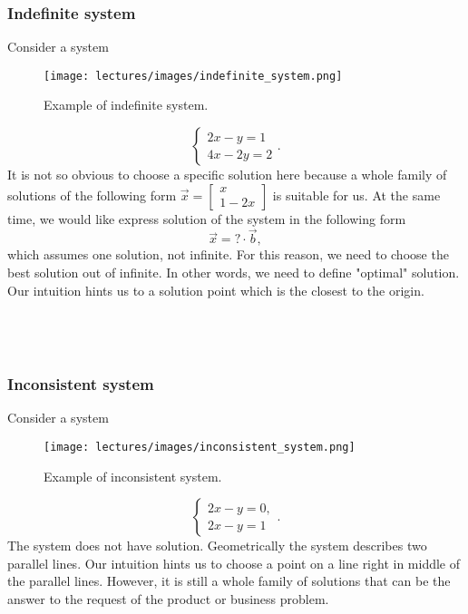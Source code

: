 \subsubsection*{Indefinite system}
    \Ex Consider a system~~~~~~~~~~~~~~~~~~~~~~~~~~~~~~~~~~~~~~~
    \begin{wrapfigure}[15]{r}{0.4\columnwidth}
        \texttt{[image: lectures/images/indefinite\_system.png]}
        \caption*{\scriptsize{Example of indefinite system.}}
    \end{wrapfigure}
    \[
        \left\{
            \begin{array}{l}
                2x-y=1\\
                4x-2y=2
            \end{array}.
        \right.  
    \]
    It is not so obvious to choose a specific solution here because a whole family of solutions of the following form 
    $\vec{x} = 
    \begin{bmatrix}
        x\\1-2x
    \end{bmatrix}$ is suitable for us. At the same time, we would like express solution of the system in the following form
    \[
        \vec{x} = ?\cdot \vec{b},
    \]
    which assumes one solution, not infinite. For this reason, we need to choose the best solution out of infinite. In other words, we need to define "optimal" solution. Our intuition hints us to a solution point which is the closest to the origin. \\\\\\\\
    

\subsubsection*{Inconsistent system}    
     \Ex Consider a system~~~~~~~~~~~~~~~~~~~~~~~~~~~~~~~~~~~~~~~
        \begin{wrapfigure}[8]{r}{0.4\columnwidth}
            \texttt{[image: lectures/images/inconsistent\_system.png]}
            \caption*{\scriptsize{Example of inconsistent system.}}
            \label{fig:inconsistent_with_vectors}
        \end{wrapfigure}  
        $$
            \left\{
                \begin{array}{c}
                    2x-y=0,\\
                    2x-y=1
                \end{array}.
            \right.  
        $$
        The system does not have solution. Geometrically the system describes two parallel lines. Our intuition hints us to choose a point on a line right in middle of the parallel lines. However, it is still a whole family of solutions that can be the answer to the request of the product or business problem. 
        \newpage
